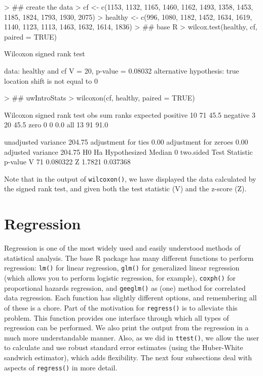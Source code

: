 \documentclass[landscape]{article}
\renewenvironment{Schunk}{\vspace{\topsep}}{\vspace{\topsep}}
\begin{document}
\begin{Schunk}
\begin{Sinput}
> ## create the data
> cf <- c(1153, 1132, 1165, 1460, 1162, 1493, 1358, 1453, 1185, 1824, 1793, 1930, 2075)
> healthy <- c(996, 1080, 1182, 1452, 1634, 1619, 1140, 1123, 1113, 1463, 1632, 1614, 1836)
> ## base R
> wilcox.test(healthy, cf, paired = TRUE)
\end{Sinput}
\begin{Soutput}
	Wilcoxon signed rank test

data:  healthy and cf
V = 20, p-value = 0.08032
alternative hypothesis: true location shift is not equal to 0
\end{Soutput}
\begin{Sinput}
> ## uwIntroStats
> wilcoxon(cf, healthy, paired = TRUE)
\end{Sinput}
\begin{Soutput}
 Wilcoxon signed rank test 
         obs sum ranks expected
positive  10        71     45.5
negative   3        20     45.5
zero       0         0      0.0
all       13        91     91.0
                            
unadjusted variance   204.75
adjustment for ties     0.00
adjustment for zeroes   0.00
adjusted variance     204.75
                    H0 Ha       
Hypothesized Median 0  two.sided
  Test Statistic p-value 
V 71             0.080322
Z 1.7821         0.037368
\end{Soutput}
\end{Schunk}

Note that in the output of \texttt{wilcoxon()}, we have displayed the data calculated by the signed rank test, and given both the test statistic (V) and the z-score (Z).

\section{Regression}
Regression is one of the most widely used and easily understood methods of statistical analysis. The base R package has many different functions to perform regression: \texttt{lm()} for linear regression, \texttt{glm()} for generalized linear regression (which allows you to perform logistic regression, for example), \texttt{coxph()} for proportional hazards regression, and \texttt{geeglm()} as (one) method for correlated data regression. Each function has slightly different options, and remembering all of these is a chore. Part of the motivation for \texttt{regress()} is to alleviate this problem. This function provides one interface through which all types of regression can be performed. We also print the output from the regression in a much more understandable manner. Also, as we did in \texttt{ttest()}, we allow the user to calculate and use robust standard error estimates (using the Huber-White sandwich estimator), which adds flexibility. The next four subsections deal with aspects of \texttt{regress()} in more detail.
\end{document}
